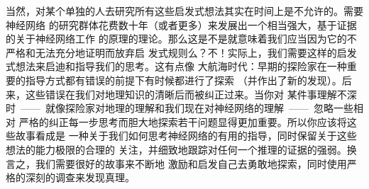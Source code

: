 当然，对某个单独的人去研究所有这些启发式想法其实在时间上是不允许的。需要神经网络
的研究群体花费数十年（或者更多）来发展出一个相当强大，基于证据的关于神经网络工作
的原理的理论。那么这是不是就意味着我们应当因为它的不严格和无法充分地证明而放弃启
发式规则么？不！实际上，我们需要这样的启发式想法来启迪和指导我们的思考。这有点像
大航海时代：早期的探险家在一种重要的指导方式都有错误的前提下有时候都进行了探索
（并作出了新的发现）。后来，这些错误在我们对地理知识的清晰后而被纠正过来。当你对
某件事理解不深时~——~就像探险家对地理的理解和我们现在对神经网络的理解~——~忽略一些相对
严格的纠正每一步思考而胆大地探索若干问题显得更加重要。所以你应该将这些故事看成是
一种关于我们如何思考神经网络的有用的指导，同时保留关于这些想法的能力极限的合理的
关注，并细致地跟踪对任何一个推理的证据的强弱。换言之，我们需要很好的故事来不断地
激励和启发自己去勇敢地探索，同时使用严格的深刻的调查来发现真理。
